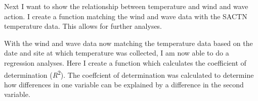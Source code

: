 \documentclass[10pt,a4,]{article}
\newenvironment{Shaded}{\begin{snugshade}}{\end{snugshade}}
\newcommand{\ControlFlowTok}[1]{\textcolor[rgb]{0.13,0.29,0.53}{\textbf{#1}}}
\newcommand{\DataTypeTok}[1]{\textcolor[rgb]{0.13,0.29,0.53}{#1}}
\newcommand{\DecValTok}[1]{\textcolor[rgb]{0.00,0.00,0.81}{#1}}
\newcommand{\KeywordTok}[1]{\textcolor[rgb]{0.13,0.29,0.53}{\textbf{#1}}}
\newcommand{\NormalTok}[1]{#1}
\newcommand{\OperatorTok}[1]{\textcolor[rgb]{0.81,0.36,0.00}{\textbf{#1}}}
\newcommand{\OtherTok}[1]{\textcolor[rgb]{0.56,0.35,0.01}{#1}}
\newcommand{\StringTok}[1]{\textcolor[rgb]{0.31,0.60,0.02}{#1}}
\begin{document}
Next I want to show the relationship between temperature and wind and
wave action. I create a function matching the wind and wave data with
the SACTN temperature data. This allows for further analyses.

\begin{Shaded}
\end{Shaded}

With the wind and wave data now matching the temperature data based on
the date and site at which temperature was collected, I am now able to
do a regression analyses. Here I create a function which calculates the
coefficient of determination (\emph{R}\textsuperscript{2}). The
coeffcient of determination was calculated to determine how differences
in one variable can be explained by a difference in the second variable.
\end{document}
